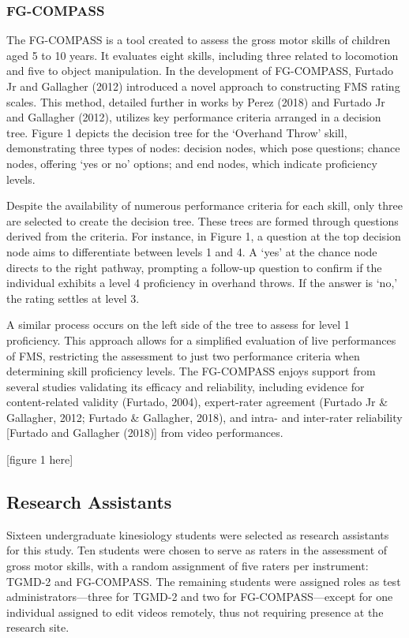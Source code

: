 \documentclass[
  man,
  colorlinks=true,linkcolor=blue,citecolor=blue,urlcolor=blue]{apa7}
\begin{document}
\subsubsection{FG-COMPASS}\label{fg-compass}

The FG-COMPASS is a tool created to assess the gross motor skills of
children aged 5 to 10 years. It evaluates eight skills, including three
related to locomotion and five to object manipulation. In the
development of FG-COMPASS, Furtado Jr and Gallagher (2012) introduced a
novel approach to constructing FMS rating scales. This method, detailed
further in works by Perez (2018) and Furtado Jr and Gallagher (2012),
utilizes key performance criteria arranged in a decision tree. Figure 1
depicts the decision tree for the `Overhand Throw' skill, demonstrating
three types of nodes: decision nodes, which pose questions; chance
nodes, offering `yes or no' options; and end nodes, which indicate
proficiency levels.

Despite the availability of numerous performance criteria for each
skill, only three are selected to create the decision tree. These trees
are formed through questions derived from the criteria. For instance, in
Figure 1, a question at the top decision node aims to differentiate
between levels 1 and 4. A `yes' at the chance node directs to the right
pathway, prompting a follow-up question to confirm if the individual
exhibits a level 4 proficiency in overhand throws. If the answer is
`no,' the rating settles at level 3.

A similar process occurs on the left side of the tree to assess for
level 1 proficiency. This approach allows for a simplified evaluation of
live performances of FMS, restricting the assessment to just two
performance criteria when determining skill proficiency levels. The
FG-COMPASS enjoys support from several studies validating its efficacy
and reliability, including evidence for content-related validity
(Furtado, 2004), expert-rater agreement (Furtado Jr \& Gallagher, 2012;
Furtado \& Gallagher, 2018), and intra- and inter-rater reliability
{[}Furtado and Gallagher (2018){]} from video performances.

{[}figure 1 here{]}

\subsection{Research Assistants}\label{research-assistants}

Sixteen undergraduate kinesiology students were selected as research
assistants for this study. Ten students were chosen to serve as raters
in the assessment of gross motor skills, with a random assignment of
five raters per instrument: TGMD-2 and FG-COMPASS. The remaining
students were assigned roles as test administrators---three for TGMD-2
and two for FG-COMPASS---except for one individual assigned to edit
videos remotely, thus not requiring presence at the research site.
\end{document}
